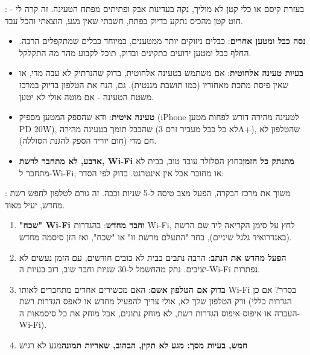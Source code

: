 
: בעזרת קיסם או כלי קטן לא מוליך, נקה בעדינות אבק ופתיתים מפתח הטעינה. זה קרה לי - חוט קטן מהכיס נתקע בדיוק בפתח, חשבתי שאין מגע, הוצאתי והכל עבד.

\begin{itemize}
  \item \textbf{נסה כבל ומטען אחרים}: כבלים ניזוקים יותר ממטענים, במיוחד כבלים שמתקפלים הרבה. החלף כבל ומטען ידועים כתקינים ובדוק, תוכל לקבוע מהר מה התקלקל.
  \item \textbf{בעיות טעינה אלחוטית}: אם משתמש בטעינה אלחוטית, בדוק שהנרתיק לא עבה מדי, או שאין פיסת מתכת מאחוריו (כמו תושבת מגנטית). גם, הנח את הטלפון בדיוק במרכז משטח הטעינה - אם מוטה אולי לא יטען.
  \item \textbf{טעינה איטית}: ודא שהספק המטען מספיק (iPhone לטעינה מהירה דורש לפחות מטען PD 20W), שהכבל תומך בטעינה מהירה (לא כל כבל מעביר זרם 3A+), שהטלפון לא חם מדי (חום יוריד הספק להגנת הסוללה).
  \item \textbf{ארבע, לא מתחבר לרשת, Wi-Fi מתנתק כל הזמן}בחוץ הסלולר עובד טוב, בבית לא מתחבר ל-Wi-Fi; או מחובר אבל אין אינטרנט. בדוק לפי הסדר:
\end{itemize}


: משוך את מרכז הבקרה, הפעל מצב טיסה ל-5 שניות וכבה. זה גורם לטלפון לחפש רשת מחדש, יעיל מאוד.

\begin{enumerate}
  \item \textbf{"שכח" Wi-Fi וחבר מחדש}: בהגדרות Wi-Fi, לחץ על סימן הקריאה ליד שם הרשת (באנדרואיד גלגל שיניים), בחר "התעלם מרשת זו" או "שכח", ואז הזן סיסמה מחדש.
  \item \textbf{הפעל מחדש את הנתב}: הרבה נתבים בבית לא כובים חודשים, עם הזמן נעשים לא יציבים. נתק מהחשמל ל-30 שניות וחבר שוב, רוב בעיות ה-Wi-Fi נפתרות.
  \item \textbf{בדוק אם הטלפון אשם}: האם מכשירים אחרים מתחברים לאותו Wi-Fi בסדר? אם כן ורק הטלפון שלך לא, אולי צריך להפעיל מחדש או לאפס הגדרות רשת (הגדרות כללי העברה או איפוס איפוס הגדרות רשת, לא מוחק נתונים, אבל מוחק את כל סיסמאות ה-Wi-Fi).
  \item \textbf{חמש, בעיות מסך: מגע לא תקין, הבהוב, שאריות תמונה}מגע לא רגיש
\end{enumerate}


